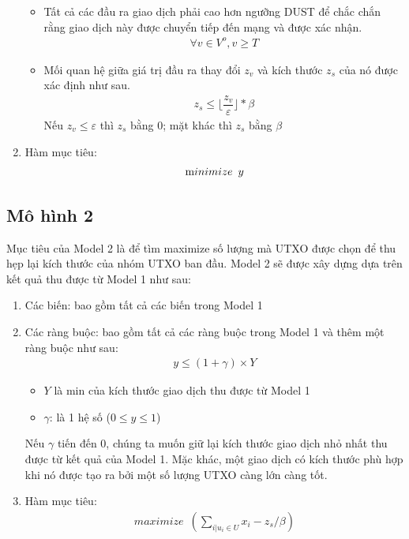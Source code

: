 \begin{enumerate}
\begin{itemize}
        \item Tất cả các đầu ra giao dịch phải cao hơn ngưỡng DUST để chắc chắn rằng giao dịch này được chuyển tiếp đến mạng và được xác nhận. 
        \begin{align}
        \forall v \in {V^o},v \ge T
		\end{align}
		
        \item Mối quan hệ giữa giá trị đầu ra thay đổi $z_v$ và kích thước $z_s$ của nó được xác định như sau.
        \begin{align}
        z_s \le \lfloor\dfrac{z_v}{\varepsilon}\rfloor * \beta
        \end{align}
		Nếu $z_v \le \varepsilon$ thì $z_s$ bằng $0$; mặt khác thì $z_s$ bằng $\beta$
   
        \end{itemize}

        \item Hàm mục tiêu: 
		\begin{align}
		\text minimize \enspace y
		\end{align}
\end{enumerate}

\subsection{Mô hình 2}
Mục tiêu của Model 2 là để tìm maximize số lượng mà UTXO được chọn để thu hẹp lại kích thước của nhóm UTXO ban đầu. Model 2 sẽ được xây dựng dựa trên kết quả thu được từ Model 1 như sau:
\begin{enumerate}
    \item Các biến: bao gồm tất cả các biến trong Model 1
    
    \item Các ràng buộc: bao gồm tất cả các ràng buộc trong Model 1 và thêm một ràng buộc như sau:
	\begin{align}
	y \le (1 + \gamma) \times Y
	\end{align}

    \begin{itemize}
        \item $Y$ là min của kích thước giao dịch thu được từ Model 1
        \item $\gamma$: là 1 hệ số ($0 \le y \le 1$)
	\end{itemize}
	
    Nếu $\gamma$ tiến đến 0, chúng ta muốn giữ lại kích thước giao dịch nhỏ nhất thu được từ kết quả của Model 1. Mặc khác, một giao dịch có kích thước phù hợp khi nó được tạo ra bởi một số lượng UTXO càng lớn càng tốt. 
    \item Hàm mục tiêu:
        \begin{align}
            maximize \enspace (\displaystyle \sum_{i|u_i\in U}x_i - z_s/\beta)
        \end{align}
\end{enumerate}